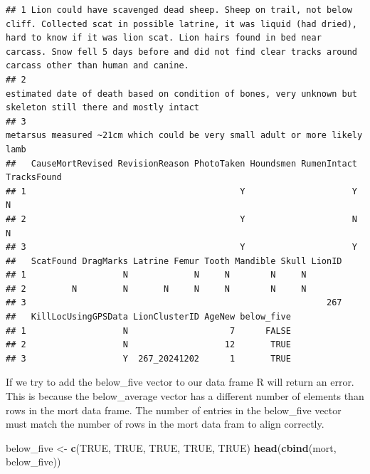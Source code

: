 \documentclass[
]{book}
\newenvironment{Shaded}{\begin{snugshade}}{\end{snugshade}}
\newcommand{\ConstantTok}[1]{\textcolor[rgb]{0.56,0.35,0.01}{#1}}
\newcommand{\FunctionTok}[1]{\textcolor[rgb]{0.13,0.29,0.53}{\textbf{#1}}}
\newcommand{\NormalTok}[1]{#1}
\newcommand{\OtherTok}[1]{\textcolor[rgb]{0.56,0.35,0.01}{#1}}
\begin{document}
\begin{verbatim}
## 1 Lion could have scavenged dead sheep. Sheep on trail, not below cliff. Collected scat in possible latrine, it was liquid (had dried), hard to know if it was lion scat. Lion hairs found in bed near carcass. Snow fell 5 days before and did not find clear tracks around carcass other than human and canine.
## 2                                                                                                                                                                                                    estimated date of death based on condition of bones, very unknown but skeleton still there and mostly intact
## 3                                                                                                                                                                                                                                     metarsus measured ~21cm which could be very small adult or more likely lamb
##   CauseMortRevised RevisionReason PhotoTaken Houndsmen RumenIntact TracksFound
## 1                                          Y                     Y           N
## 2                                          Y                     N           N
## 3                                          Y                     Y            
##   ScatFound DragMarks Latrine Femur Tooth Mandible Skull LionID
## 1                   N             N     N        N     N       
## 2         N         N       N     N     N        N     N       
## 3                                                           267
##   KillLocUsingGPSData LionClusterID AgeNew below_five
## 1                   N                    7      FALSE
## 2                   N                   12       TRUE
## 3                   Y  267_20241202      1       TRUE
\end{verbatim}

If we try to add the below\_five vector to our data frame R will return an error. This is because the below\_average vector has a different number of elements than rows in the mort data frame. The number of entries in the below\_five vector must match the number of rows in the mort data fram to align correctly.

\begin{Shaded}
\begin{Highlighting}[]
\NormalTok{below\_five }\OtherTok{\textless{}{-}} \FunctionTok{c}\NormalTok{(}\ConstantTok{TRUE}\NormalTok{, }\ConstantTok{TRUE}\NormalTok{, }\ConstantTok{TRUE}\NormalTok{, }\ConstantTok{TRUE}\NormalTok{, }\ConstantTok{TRUE}\NormalTok{)}
\FunctionTok{head}\NormalTok{(}\FunctionTok{cbind}\NormalTok{(mort, below\_five))}
\end{Highlighting}
\end{Shaded}
\end{document}
